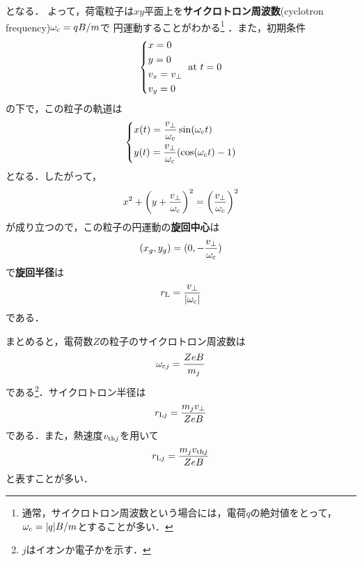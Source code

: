 \documentclass{report}
\begin{document}
      となる．
      よって，荷電粒子は$xy$平面上を\textbf{サイクロトロン周波数}(cyclotron frequency)$\omega_{\mathrm{c}} = qB/m$で
      円運動することがわかる\footnote{
        通常，サイクロトロン周波数という場合には，電荷$q$の絶対値をとって，$\omega_{\mathrm{c}} = |q|B/m$とすることが多い．
      }
      ．また，初期条件
      \begin{align}
        \begin{dcases}
          x = 0\\
          y = 0\\
          v_x = v_{\perp}\\
          v_y = 0
        \end{dcases}
        \ \mathrm{at}\ t = 0
      \end{align}
      の下で，この粒子の軌道は
      \begin{align}
        \begin{dcases}
          x(t) = \frac{v_{\perp}}{\omega_{\mathrm{c}}}\sin(\omega_{\mathrm{c}}t)\\
          y(t) = \frac{v_{\perp}}{\omega_{\mathrm{c}}}(\cos(\omega_{\mathrm{c}}t)-1)
        \end{dcases}
      \end{align}
      となる．したがって，
      \begin{align}
        x^2 + \qty(y + \frac{v_{\perp}}{\omega_{\mathrm{c}}})^2 = \qty(\frac{v_{\perp}}{\omega_{\mathrm{c}}})^2
      \end{align}
      が成り立つので，この粒子の円運動の\textbf{旋回中心}は
      \begin{align}
        (x_g,y_g) = (0, -\frac{v_{\perp}}{\omega_{\mathrm{c}}})
      \end{align}
      で\textbf{旋回半径}は
      \begin{align}
        r_{\mathrm{L}} = \frac{v_{\perp}}{\abs{\omega_{\mathrm{c}}}}
      \end{align}
      である．

      まとめると，電荷数$Z$の粒子のサイクロトロン周波数は
      \begin{align}
        \omega_{\mathrm{c}j} = \frac{Z e B}{m_j}
      \end{align}
      である\footnote{$j$はイオンか電子かを示す．}．サイクロトロン半径は
      \begin{align}
        r_{\mathrm{L}j} = \frac{m_j v_{\perp}}{ZeB}
      \end{align}
      である．また，熱速度$v_{{\mathrm{th}}j}$を用いて
      \begin{align}
        r_{\mathrm{L}j} = \frac{m_j v_{{\mathrm{th}}j}}{ZeB}
      \end{align}
      と表すことが多い．
\end{document}
